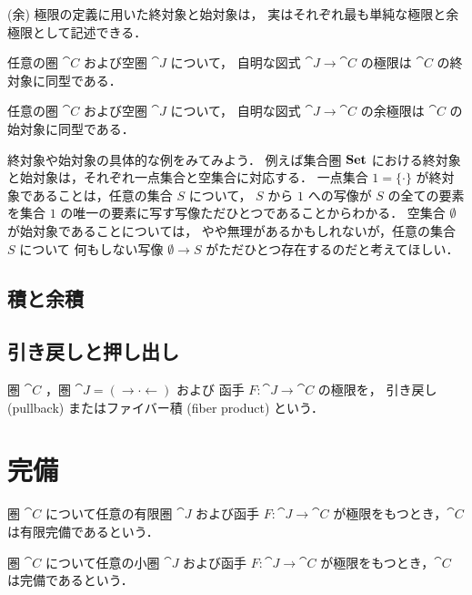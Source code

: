 \documentclass[titlepage]{ltjsreport}
\newtheorem[S]{theorem}{定理}[chapter]
\newtheorem[S]{definition}[theorem]{定義}
\newtheorem[S]{example}[theorem]{例}
\begin{document}
(余) 極限の定義に用いた終対象と始対象は，
実はそれぞれ最も単純な極限と余極限として記述できる．
\begin{theorem}[極限としての終対象]
  任意の圏 $\cat{C}$ および空圏 $\cat{J}$ について，
  自明な図式 $\cat{J}\to\cat{C}$ の極限は
  $\cat{C}$ の終対象に同型である．
\end{theorem}
\begin{theorem}[余極限としての始対象]
  任意の圏 $\cat{C}$ および空圏 $\cat{J}$ について，
  自明な図式 $\cat{J}\to\cat{C}$ の余極限は
  $\cat{C}$ の始対象に同型である．
\end{theorem}
終対象や始対象の具体的な例をみてみよう．
例えば集合圏 $\mathbf{Set}$ における終対象と始対象は，それぞれ一点集合と空集合に対応する．
一点集合 $1=\{\cdot\}$ が終対象であることは，任意の集合 $S$ について，
$S$ から $1$ への写像が $S$ の全ての要素を集合 $1$ の唯一の要素に写す写像ただひとつであることからわかる．
空集合 $\emptyset$ が始対象であることについては，
やや無理があるかもしれないが，任意の集合 $S$ について
何もしない写像 $\emptyset\to S$ がただひとつ存在するのだと考えてほしい．

\subsection{積と余積}

\subsection{引き戻しと押し出し}

\begin{definition}[引き戻し]
  圏 $\cat{C}$ ，圏 $\cat{J}=(\rightarrow\cdot\leftarrow)$ および
  函手 $F:\cat{J}\to\cat{C}$ の極限を，
  引き戻し (pullback) またはファイバー積 (fiber product) という．
\end{definition}

\section{完備}

\begin{definition}[有限完備]
  圏 $\cat{C}$ について任意の有限圏 $\cat{J}$ および函手 $F:\cat{J}\to\cat{C}$
  が極限をもつとき，$\cat{C}$ は有限完備であるという．
\end{definition}

\begin{definition}[完備]
  圏 $\cat{C}$ について任意の小圏 $\cat{J}$ および函手 $F:\cat{J}\to\cat{C}$
  が極限をもつとき，$\cat{C}$ は完備であるという．
\end{definition}
\end{document}
